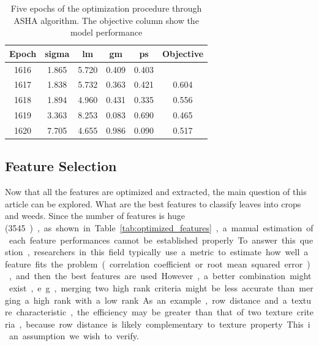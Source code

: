 \documentclass[../thesis.tex]{subfiles}
\begin{document}
    \vfill
    \begin{table}[H]
        \centering
        \begin{tabular}{|c|cccc|c|} \hline
            \textbf{Epoch} & \textbf{sigma} & \textbf{lm} & \textbf{gm} & \textbf{ps} & \textbf{Objective} \\ \hline
            1616 & 1.865 & 5.720 & 0.409 & 0.403 & \cellcolor{green!25}{0.621} \\
            1617 & 1.838 & 5.732 & 0.363 & 0.421 & 0.604 \\
            1618 & 1.894 & 4.960 & 0.431 & 0.335 & 0.556 \\
            1619 & 3.363 & 8.253 & 0.083 & 0.690 & 0.465 \\
            1620 & 7.705 & 4.655 & 0.986 & 0.090 & 0.517 \\ \hline
        \end{tabular}
        \caption{Five epochs of the optimization procedure through ASHA algorithm. The objective column show the model performance}
        \label{tab:asha}
    \end{table}
    \vfill \null
    
    \newpage
    \subsection{Feature Selection}
    \label{sec:weed-discrimination-fv-selection}
    
    Now that all the features are optimized and extracted, the main question of this article can be explored. What are the best features to classify leaves into crops and weeds. Since the number of features is huge (\SI{3545}), as shown in Table \ref{tab:optimized_features}, a manual estimation of each feature performances cannot be established properly. To answer this question, researchers in this field typically use a metric to estimate how well a feature fits the problem (correlation coefficient or root mean squared error), and then the best features are used. However, a better combination might exist, e.g., merging two high rank criteria might be less accurate than merging a high rank with a low rank. As an example, row distance and a texture characteristic, the efficiency may be greater than that of two texture criteria, because row distance is likely complementary to texture property. This i an assumption we wish to verify.
    
\end{document}
